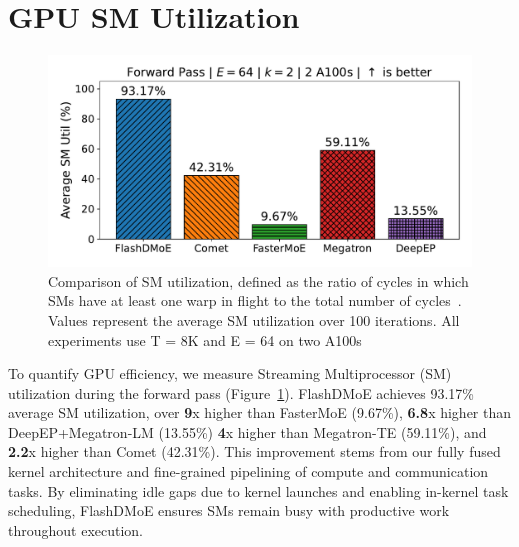 \section{GPU SM Utilization}\label{sec:gpu-utilization}
\begin{figure}[!ht]
    \centering
    \centering
    \includegraphics[width=0.8\linewidth, keepaspectratio]{figures/sm_util}
    \caption{Comparison of SM utilization, defined as the ratio of cycles in which SMs
    have at least one warp in flight
    to the total number of cycles~\cite{nsight-metrics}.
    Values represent the average SM utilization over 100 iterations.
    All experiments use T = 8K and E = 64 on two A100s}
    \label{fig:smu}
\end{figure}
To quantify GPU efficiency, we measure Streaming Multiprocessor (SM) utilization during the forward pass (Figure~\ref{fig:smu}).
FlashDMoE achieves 93.17\% average SM utilization,
over \textbf{9}x higher than FasterMoE (9.67\%), \textbf{6.8}x higher than DeepEP+Megatron-LM (13.55\%)
\textbf{4}x higher than Megatron-TE (59.11\%), and
\textbf{2.2}x higher than Comet (42.31\%).
This improvement stems from our fully fused kernel architecture and
fine-grained pipelining of compute and communication tasks.
By eliminating idle gaps due to kernel launches and enabling in-kernel task scheduling,
FlashDMoE ensures SMs remain busy with productive work throughout execution.
